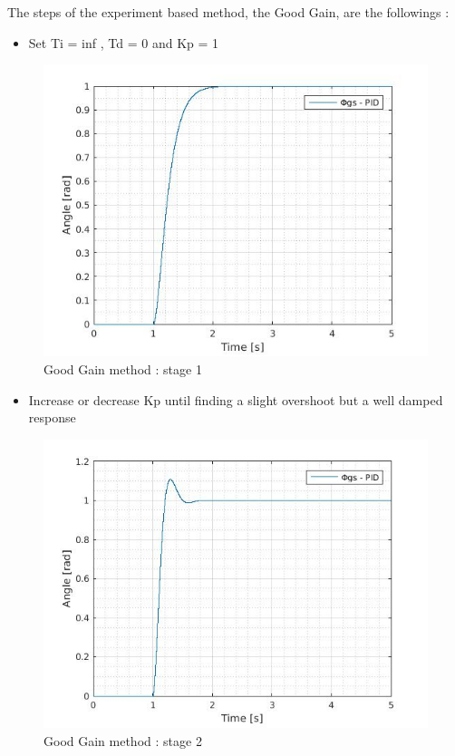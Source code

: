 The steps of the experiment based method, the Good Gain, are the followings :\par 
  
\begin{itemize}
  \item Set Ti = inf , Td = 0 and Kp = 1
\end{itemize}
  
  \begin{figure}[H]
    \centering
    \includegraphics[scale=0.4]{figures/GG1.jpg}
    \caption[LABEL] {Good Gain method : stage 1} 
  \end{figure}
  

\begin{itemize}
  \item Increase or decrease Kp until finding a slight overshoot but a well damped response
\end{itemize}
  
  \begin{figure}[H]
    \centering
    \includegraphics[scale=0.4]{figures/GG2.jpg}
    \caption[LABEL] {Good Gain method : stage 2} 
  \end{figure}
    
